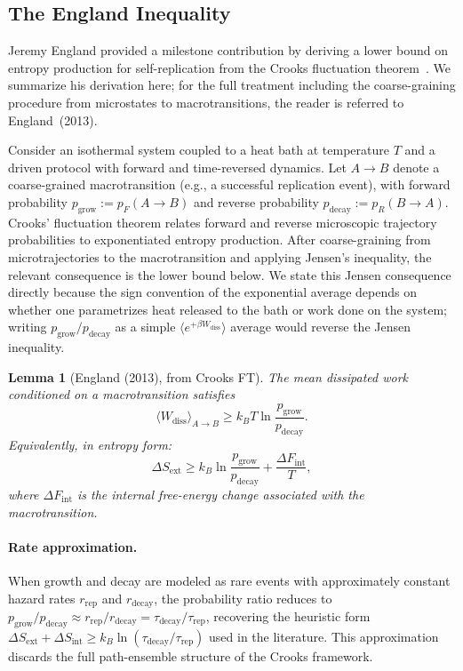 \documentclass[12pt,a4paper]{article}
\newtheorem{lemma}{Lemma}
\theoremstyle{remark}
\begin{document}
\subsection{The England Inequality}

Jeremy England provided a milestone contribution by deriving a lower bound on entropy production for self-replication from the Crooks fluctuation theorem~\citep{Crooks1999,England2013}. We summarize his derivation here; for the full treatment including the coarse-graining procedure from microstates to macrotransitions, the reader is referred to England~(2013).

Consider an isothermal system coupled to a heat bath at temperature $T$ and a driven protocol with forward and time-reversed dynamics. Let $A \to B$ denote a coarse-grained macrotransition (e.g., a successful replication event), with forward probability $p_{\mathrm{grow}} := p_F(A \to B)$ and reverse probability $p_{\mathrm{decay}} := p_R(B \to A)$. Crooks' fluctuation theorem relates forward and reverse microscopic trajectory probabilities to exponentiated entropy production. After coarse-graining from microtrajectories to the macrotransition and applying Jensen's inequality, the relevant consequence is the lower bound below. We state this Jensen consequence directly because the sign convention of the exponential average depends on whether one parametrizes heat released to the bath or work done on the system; writing $p_{\mathrm{grow}}/p_{\mathrm{decay}}$ as a simple $\langle e^{+\beta W_{\mathrm{diss}}}\rangle$ average would reverse the Jensen inequality.

\begin{lemma}[England (2013), from Crooks FT]
\label{lem:england}
The mean dissipated work conditioned on a macrotransition satisfies
\begin{equation}
\langle W_{\mathrm{diss}} \rangle_{A \to B} \geq k_B T \ln \frac{p_{\mathrm{grow}}}{p_{\mathrm{decay}}}.
\end{equation}
Equivalently, in entropy form:
\begin{equation}
\Delta S_{\mathrm{ext}} \geq k_B \ln \frac{p_{\mathrm{grow}}}{p_{\mathrm{decay}}} + \frac{\Delta F_{\mathrm{int}}}{T},
\end{equation}
where $\Delta F_{\mathrm{int}}$ is the internal free-energy change associated with the macrotransition.
\end{lemma}

\paragraph{Rate approximation.} When growth and decay are modeled as rare events with approximately constant hazard rates $r_{\mathrm{rep}}$ and $r_{\mathrm{decay}}$, the probability ratio reduces to $p_{\mathrm{grow}} / p_{\mathrm{decay}} \approx r_{\mathrm{rep}} / r_{\mathrm{decay}} = \tau_{\mathrm{decay}} / \tau_{\mathrm{rep}}$, recovering the heuristic form $\Delta S_{\mathrm{ext}} + \Delta S_{\mathrm{int}} \geq k_B \ln(\tau_{\mathrm{decay}} / \tau_{\mathrm{rep}})$ used in the literature. This approximation discards the full path-ensemble structure of the Crooks framework.
\end{document}

